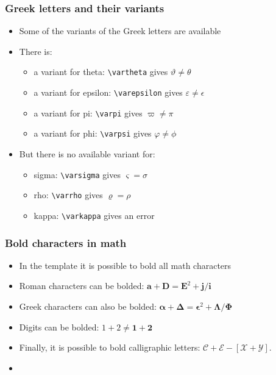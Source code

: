 \documentclass[11pt, aspectratio=169, xcolor={dvipsnames}, usepdftitle=false]{beamer}
\begin{document}
\begin{frame}
\frametitle{Greek letters and their variants}
\begin{itemize}
\item Some  of the variants of the Greek letters are available
\item There is:
\begin{itemize}
\item a variant for theta: \texttt{\textbackslash vartheta} gives $\vartheta \neq \theta$
\item a variant for epsilon: \texttt{\textbackslash varepsilon} gives $\varepsilon \neq \epsilon$
\item a variant for pi: \texttt{\textbackslash varpi} gives $\varpi \neq \pi$
\item a variant for phi: \texttt{\textbackslash varpsi} gives $\varphi \neq \phi$
\end{itemize}
\item But there is no available variant for:
\begin{itemize}
\item sigma: \texttt{\textbackslash varsigma} gives $\varsigma = \sigma$
\item rho: \texttt{\textbackslash varrho} gives $\varrho = \rho$
\item kappa: \texttt{\textbackslash varkappa} gives an error
\end{itemize}
 \end{itemize}	
\end{frame}

\begin{frame}
\frametitle{Bold characters in math}
\begin{itemize}
\item In the template it is possible to bold all math characters
\item Roman characters can be bolded: $\bm{a} + \bm{D} = \bm{E}^2 + \bm{j}/\bm{i}$
\item Greek characters can also be bolded: $\bm{\alpha} + \bm{\Delta} = \bm{\epsilon}^2 + \bm{\Lambda}/\bm{\Phi}$
\item Digits can be bolded: $1 + 2 \neq \bm{1} + \bm{2}$
\item Finally, it is possible to bold calligraphic letters: $\bm{\mathcal{C}} + \bm{\mathcal{E}} - [\bm{\mathcal{X}}+\bm{\mathcal{Y}}]$.
\item {}
\end{itemize}	
\end{frame}
\end{document}
